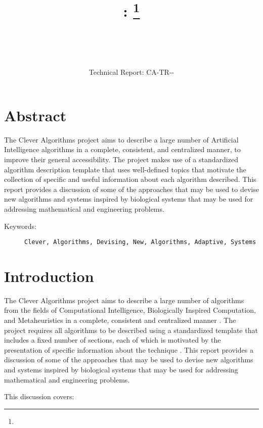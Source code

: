 \documentclass[a4paper, 11pt]{article}
\title{{\myreporttitle}: {\myreportsubtitle}\footnote{\myreportlicense}}
\author{\myreportauthor\\{\myreportemail}\\\small\myreportproject}
\date{\myreportfulldate\\{\small{Technical Report: CA-TR-{\myreportdate}-\myreportversion}}}
\begin{document}
\maketitle

\section*{Abstract} 
The Clever Algorithms project aims to describe a large number of Artificial Intelligence algorithms in a complete, consistent, and centralized manner, to improve their general accessibility. 
The project makes use of a standardized algorithm description template that uses well-defined topics that motivate the collection of specific and useful information about each algorithm described.
This report provides a discussion of some of the approaches that may be used to devise new algorithms and systems inspired by biological systems that may be used for addressing mathematical and engineering problems.

\begin{description}
	\item[Keywords:] {\small\texttt{Clever, Algorithms, Devising, New, Algorithms, Adaptive, Systems}}
\end{description} 

\section{Introduction}
\label{sec:introduction}
The Clever Algorithms project aims to describe a large number of algorithms from the fields of Computational Intelligence, Biologically Inspired Computation, and Metaheuristics in a complete, consistent and centralized manner \cite{Brownlee2010}.
The project requires all algorithms to be described using a standardized template that includes a fixed number of sections, each of which is motivated by the presentation of specific information about the technique \cite{Brownlee2010a}.
This report provides a discussion of some of the approaches that may be used to devise new algorithms and systems inspired by biological systems that may be used for addressing mathematical and engineering problems.

This discussion covers:
\end{document}
